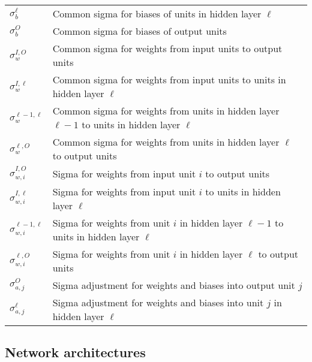 \documentclass{report}[11pt]
\begin{document}
\begin{table}[p]
\begin{center}
\begin{tabular}{ll}
  $\sigma^{\ell}_b$   & Common sigma for biases of units in hidden layer 
                      $\ell$ \\[3pt]
  $\sigma^O_b$        & Common sigma for biases of output units \\[10pt]

  $\sigma^{I,O}_w$    & Common sigma for weights from input units to output
                        units \\[3pt]
  $\sigma^{I,\ell}_w$ & Common sigma for weights from input units to units
                        in hidden layer $\ell$ \\[3pt]
  $\sigma^{\ell\!-\!1,\ell}_w$ & Common sigma for weights from units in hidden
                             layer $\ell\!-\!1$ to units in hidden layer $\ell$ 
                             \\[3pt]
  $\sigma^{\ell,O}_w$    & Common sigma for weights from units in hidden
                           layer $\ell$ to output units \\[10pt]

  $\sigma^{I,O}_{w,i}$    & Sigma for weights from input unit $i$ to output
                            units \\[3pt]
  $\sigma^{I,\ell}_{w,i}$ & Sigma for weights from input unit $i$ to units
                            in hidden layer $\ell$ \\[3pt]
  $\sigma^{\ell\!-\!1,\ell}_{w,i}$ & Sigma for weights from unit $i$ in hidden
                             layer $\ell\!-\!1$ to units in hidden layer $\ell$ 
                                 \\[3pt]
  $\sigma^{\ell,O}_{w,i}$  & Sigma for weights from unit $i$ in hidden layer
                             $\ell$ to output units \\[10pt]

  $\sigma^O_{a,j}$      & Sigma adjustment for weights and biases into output 
                          unit $j$ \\[3pt]
  $\sigma^{\ell}_{a,j}$ & Sigma adjustment for weights and biases into unit $j$
                          in hidden layer $\ell$
\end{tabular}\end{center}
\end{table}


\subsection*{Network architectures}
\end{document}
